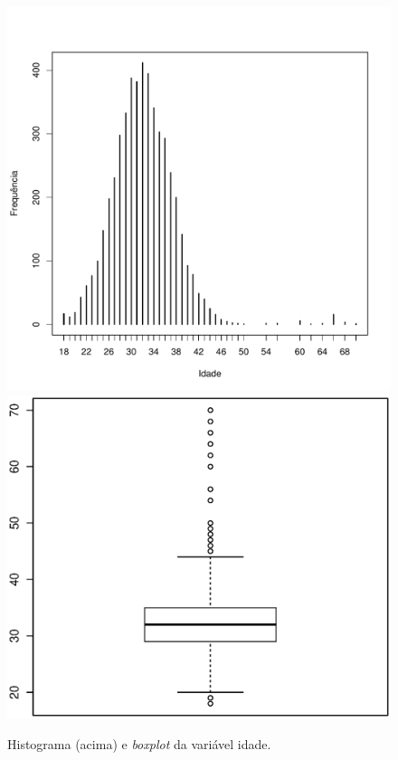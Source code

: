\documentclass[10pt,a4paper,oneside]{article}
\begin{document}
\begin{figure}[h]
\begin{minipage}{0.46\textwidth}
	\includegraphics[width=\linewidth]{plots/histograma-idade} \\
	\includegraphics[width=\linewidth]{plots/boxplot_idade.eps}

	\caption{Histograma (acima) e \emph{boxplot} da variável idade.}
	\label{figure:histograma-boxplot-idade}
\end{minipage}
\end{figure}
\end{document}
